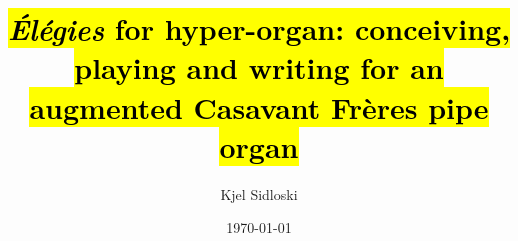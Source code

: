 \documentclass[12pt,twoside,maitrise]{dms_ks}
\theoremstyle{definition}
\begin{document}
\entetedynamique




\title{\hl{\textit{Élégies} for hyper-organ: conceiving, playing and writing for an augmented Casavant Frères pipe organ}}


\author{Kjel Sidloski}



\date{\today} %

\sujet{}








\end{document}
